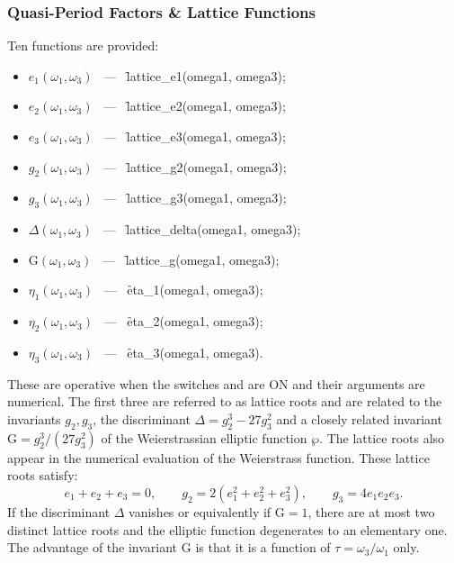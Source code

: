 \subsubsection{ Quasi-Period Factors \& Lattice Functions}
\hypertarget{ETA}{}
\hypertarget{operator:LATTICE_E1}{}
\hypertarget{operator:LATTICE_E2}{}
\hypertarget{operator:LATTICE_E3}{}
\hypertarget{operator:LATTICE_G}{}
\hypertarget{operator:LATTICE_DELTA}{}
\hypertarget{operator:LATTICE_G2}{}
\hypertarget{operator:LATTICE_G3}{}

Ten functions are provided:
\begin{itemize}
\item $e_1(\omega_1, \omega_3)$ \ --- \ \f{lattice\_e1(omega1, omega3)};
\item $e_2(\omega_1, \omega_3)$ \ --- \ \f{lattice\_e2(omega1, omega3)};
\item $e_3(\omega_1, \omega_3)$ \ --- \ \f{lattice\_e3(omega1, omega3)};
\item $g_2(\omega_1, \omega_3)$ \ --- \ \f{lattice\_g2(omega1, omega3)};
\item $g_3(\omega_1, \omega_3)$ \ --- \ \f{lattice\_g3(omega1, omega3)};
\item $\Delta(\omega_1, \omega_3)$ \ --- \ \f{lattice\_delta(omega1, omega3)};
\item $\mathrm{G}(\omega_1, \omega_3)$ \ --- \ \f{lattice\_g(omega1, omega3)};
\item $\eta_1(\omega_1, \omega_3)$ \ --- \ \f{eta\_1(omega1, omega3)};
\item $\eta_2(\omega_1, \omega_3)$ \ --- \ \f{eta\_2(omega1, omega3)};
\item $\eta_3(\omega_1, \omega_3)$ \ --- \ \f{eta\_3(omega1, omega3)}.
\end{itemize}

These are operative when the switches  and  are ON
and their arguments are numerical. The first three are referred to as lattice
roots and are related to the invariants
$g_2, g_3$, the discriminant $\Delta = g_2^3-27g_3^2$ and a closely related
invariant $\mathrm{G} = g_2^3/(27 g_3^2)$ of the Weierstrassian
elliptic function $\wp$. The lattice roots also appear in the numerical
evaluation of the Weierstrass function. These lattice roots satisfy:
\[e_1+e_2+e_3=0,\qquad g_2=2(e_1^2+e_2^2+e_3^2),\qquad g_3= 4e_1e_2e_3.\]
If the discriminant $\Delta$ vanishes or equivalently if $\mathrm{G} = 1$,
there are at most two distinct lattice roots and the elliptic function
degenerates to an elementary one. The advantage of the invariant
$\mathrm{G}$ is that it is a function of $\tau = \omega_3/\omega_1$ only.

